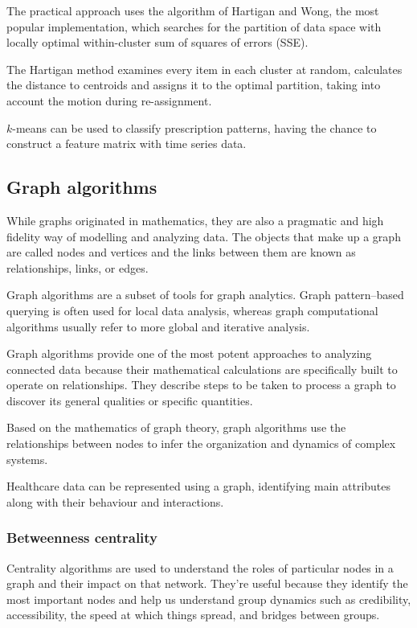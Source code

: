 The practical approach uses the algorithm of Hartigan and Wong, the most popular implementation, which searches for the partition of data space with locally optimal within-cluster sum of squares of errors (SSE).

The Hartigan method examines every item in each cluster at random, calculates the distance to centroids and assigns it to the optimal partition, taking into account the motion during re-assignment.

$k$-means can be used to classify prescription patterns, having the chance to construct a feature matrix with time series data.

\subsection{Graph algorithms}
While graphs originated in mathematics, they are also a pragmatic and high fidelity way of modelling and analyzing data. The objects that make up a graph are called nodes and vertices and the links between them are known as relationships, links, or edges. 

Graph algorithms are a subset of tools for graph analytics. Graph pattern–based querying is often used for local data analysis, whereas graph computational algorithms usually refer to more global and iterative analysis.

Graph algorithms provide one of the most potent approaches to analyzing connected data because their mathematical calculations are specifically built to operate on relationships. They describe steps to be taken to process a graph to discover its general qualities or specific quantities. 

Based on the mathematics of graph theory, graph algorithms use the relationships between nodes to infer the organization and dynamics of complex systems\cite{neo4jbook}.

Healthcare data can be represented using a graph, identifying main attributes along with their behaviour and interactions. 

\subsubsection{Betweenness centrality}
Centrality algorithms are used to understand the roles of particular nodes in a graph and their impact on that network. They’re useful because they identify the most important nodes and help us understand group dynamics such as credibility, accessibility, the speed at which things spread, and bridges between groups.

